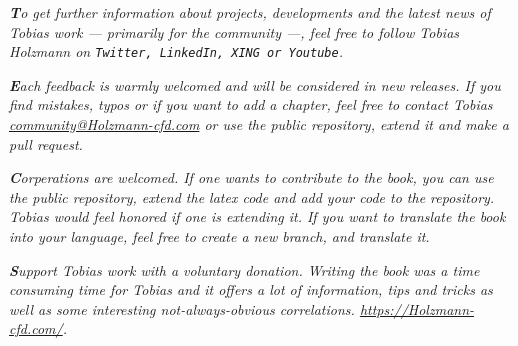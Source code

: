 \documentclass[MathematicsNumericsDerivationsAndOpenFOAM.tex]{subfiles}
\begin{document}
%
%
\vspace{20pt}
%
%
\textit{
    \textbf{T}o get further information about projects, developments and the
    latest news of Tobias work --- primarily for the community ---, feel free to
    follow Tobias Holzmann on \texttt{Twitter, LinkedIn, XING or Youtube}.
}

%
%
\vspace{20pt}
%
%
\textit{
    \textbf{E}ach feedback is warmly welcomed and will be considered in new
    releases. If you find mistakes, typos or if you want to add a chapter,
    feel free to contact Tobias \href{mailto:community@Holzmann-cfd.com}{\color{myCiteColor}community@Holzmann-cfd.com}
    or use the public repository, extend it and make a pull request.
}

%
%
\vspace{20pt}
%
%
\textit{
    \textbf{C}orperations are welcomed. If one wants to contribute to the book,
    you can use the public repository, extend the latex code and add your
    code to the repository. Tobias would feel honored if one is extending it.
    If you want to translate the book into your language, feel free to create
    a new branch, and translate it.
}

%
%
\vspace{20pt}
%
%
\textit{
    \textbf{S}upport Tobias work with a voluntary donation. Writing the book
    was a time consuming time for Tobias and it offers a lot of information,
    tips and tricks as well as some interesting not-always-obvious correlations.
    \url{https://Holzmann-cfd.com/}.
}

%
%
\newpage


\end{document}
